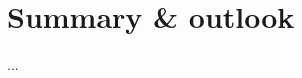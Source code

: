 \documentclass[thesis.tex]{subfiles}
\begin{document}
\chapter{Summary \& outlook}

...
\end{document}
